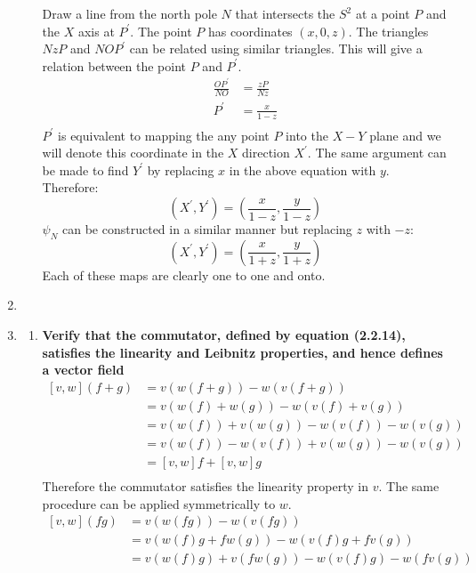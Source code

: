 \documentclass[9pt]{report}
\begin{document}
\begin{enumerate}
\begin{enumerate}
        Draw a line from the north pole $N$ that intersects the $S^2$ at a point
        $P$ and the $X$ axis at $P^\prime$. The point $P$ has coordinates
        $(x,0,z)$. The triangles $NzP$ and $NOP^\prime$ can be related using
        similar triangles. This will give a relation between the point $P$
        and $P^\prime$.
        \[
        \begin{align}
          \frac{OP^\prime}{NO}&= \frac{zP}{Nz} \\
          P^\prime &= \frac{x}{1-z}\\
        \end{align}
      \]
      $P^\prime$ is equivalent to mapping the any point $P$ into the $X-Y$ plane
      and we will denote this coordinate in the $X$ direction $X^\prime$. The same
      argument can be made to find $Y^\prime$ by replacing $x$ in the above
      equation with $y$. Therefore:
      \[
        (X^\prime, Y^\prime) = (\frac{x}{1-z}, \frac{y}{1-z})
      \]
        $\psi_N$ can be constructed in a similar manner but replacing $z$ with
        $-z$:
        \[
          (X^\prime, Y^\prime) = (\frac{x}{1+z}, \frac{y}{1+z})
        \]
      Each of these maps are clearly one to one and onto.
    \end{enumerate}
  \item
  \item
    \begin{enumerate}
    \item
    \textbf{Verify that the commutator, defined by equation (2.2.14),
    satisfies the linearity and Leibnitz properties, and hence defines a
    vector field}
  \[
    \begin{align}
    [v,w](f+g) &= v(w(f+g)) - w(v(f+g))\\
               &= v(w(f)+w(g))-w(v(f)+v(g))\\
               &= v(w(f))+v(w(g))-w(v(f))-w(v(g))\\
               &= v(w(f))-w(v(f))+v(w(g))-w(v(g))\\
               &= [v,w]f+[v,w]g\\
    \end{align}
  \]
  Therefore the commutator satisfies the linearity property in $v$. The same
  procedure can be applied symmetrically to $w$.
  \[
    \begin{align}
      [v,w](fg) &= v(w(fg)) - w(v(fg))\\
                &= v(w(f)g+fw(g)) - w(v(f)g+fv(g))\\
                &= v(w(f)g)+v(fw(g)) - w(v(f)g)-w(fv(g))\\

\end{align}\]
\end{enumerate}
\end{enumerate}
\end{document}
